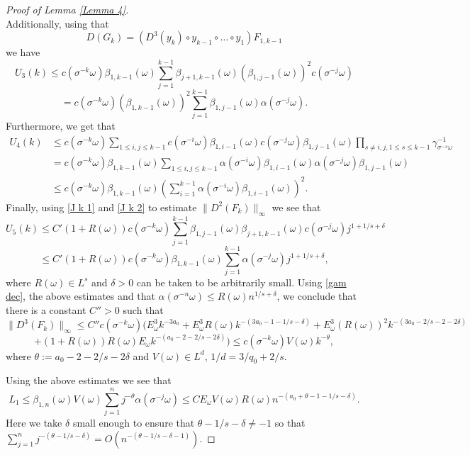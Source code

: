 \documentclass[11pt,reqno,a4paper]{article}
\theoremstyle{special}
\def\om{\omega}
\begin{document}
\begin{proof}[Proof of Lemma \ref{Lemma 4}]
$$$$
Additionally, using that 
$$
D(G_k)= (D^3(y_k) \circ y_{k-1}\circ \ldots \circ y_1)F_{1,k-1}
$$
we have 
\begin{equation}\label{U3}
U_3(k)\leq c(\sigma^{-k}\om)\beta_{1,k-1}(\om)\sum_{j=1}^{k-1}\beta_{j+1,k-1}(\om)(\beta_{1,j-1}(\om))^2 c(\sigma^{-j}\om)
\end{equation}
$$
=c(\sigma^{-k}\om)(\beta_{1,k-1}(\om))^2\sum_{j=1}^{k-1}\beta_{1,j-1}(\om)\alpha(\sigma^{-j}\om).
$$
Furthermore, 
we get that
\begin{equation}\label{U4}
\begin{split}
U_4(k) &\leq c(\sigma^{-k}\om)\sum_{1\leq i,j\leq k-1}c(\sigma^{-i}\om)\beta_{1,i-1}(\om)c(\sigma^{-j}\om)\beta_{1,j-1}(\om)\prod_{s\not=i,j, 1\leq s\leq k-1}\gamma_{\sigma^{-s}\om}^{-1} \\
&=c(\sigma^{-k}\om)\beta_{1,k-1}(\om)\sum_{1\leq i,j\leq k-1}\alpha(\sigma^{-i}\om)\beta_{1,i-1}(\om)\alpha(\sigma^{-j}\om)\beta_{1,j-1}(\om) \\
&\leq c(\sigma^{-k}\om)\beta_{1,k-1}(\om)\left(\sum_{i=1}^{k-1}\alpha(\sigma^{-i}\om)\beta_{1,i-1}(\om)\right)^2.
\end{split}
\end{equation}
Finally, using \eqref{J k 1} and \eqref{J k 2} to estimate $\|D^2(F_k)\|_\infty$ we see that
\begin{equation}\label{U5}
U_5(k)\leq C'(1+R(\om))c(\sigma^{-k}\om)\sum_{j=1}^{k-1}\beta_{1,j-1}(\om)\beta_{j+1,k-1}(\om)c(\sigma^{-j}\om)j^{1+1/s+\delta}
\end{equation}
$$
 \leq C'(1+R(\om))c(\sigma^{-k}\om)\beta_{1,k-1}(\om)\sum_{j=1}^{k-1}\alpha(\sigma^{-j}\om)j^{1+1/s+\delta},
$$
where $R(\om)\in L^s$ and $\delta>0$ can be taken to be arbitrarily small.
Using \eqref{gam dec}, the above estimates and that $\alpha(\sigma^{-n}\om)\leq R(\om)n^{1/s+\delta}$, we conclude that  there is a constant $C''>0$ such that
$$
\|D^3(F_k)\|_\infty\leq C''c(\sigma^{-k}\om)\Big(E_\om^3 k^{-3a_0}+E_\om^3 R(\om) k^{-(3a_0-1-1/s-\delta)}+E_\om^3 (R(\om))^2 k^{-(3a_0-2/s-2-2\delta)}
$$
$$
+(1+R(\om))R(\om)E_\om k^{-(a_0-2-2/s-2\delta)} \Big)\leq c(\sigma^{-k}\om)V(\om)k^{-\theta},
$$
where $\theta :=a_0-2-2/s-2\delta$
and $V(\om)\in L^d$, $1/d=3/q_0+2/s$. 

Using the above estimates we see that 
\begin{equation*}
  L_1\leq \beta_{1,n}(\om)V(\om)\sum_{j=1}^n j^{-\theta}\alpha(\sigma^{-j}\om)\leq CE_\om V(\om)R(\om)n^{-(a_0+\theta-1-1/s-\delta)}.  
\end{equation*}
Here we take $\delta$ small enough to ensure that $\theta-1/s-\delta\not=-1$ so that 
$
\sum_{j=1}^n j^{-(\theta-1/s-\delta)}=O(n^{-(\theta-1/s-\delta-1)}).
$




\end{proof}
\end{document}
